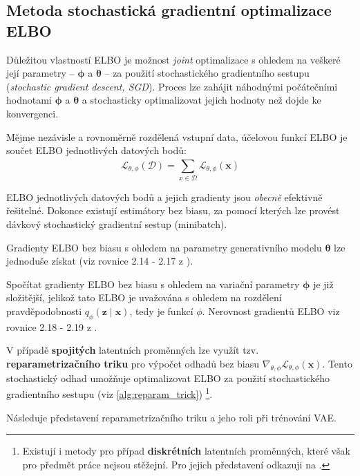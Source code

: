 \subsection{Metoda stochastická gradientní optimalizace ELBO}
Důležitou vlastností ELBO je možnost \emph{joint} optimalizace s ohledem na veškeré její parametry – $\boldsymbol{\phi}$ a $\boldsymbol{\theta}$ – za použití stochastického gradientního sestupu (\emph{stochastic gradient descent, SGD}).
Proces lze zahájit náhodnými počátečními hodnotami $\boldsymbol{\phi}$ a $\boldsymbol{\theta}$ a stochasticky optimalizovat jejich hodnoty než dojde ke konvergenci.

Mějme nezávisle a rovnoměrně rozdělená vstupní data, účelovou funkcí ELBO je součet ELBO jednotlivých datových bodů:
\begin{equation}
    \mathcal{L}_{\theta,\phi}(\mathcal{D}) = \sum_{x\in\mathcal{D}}^{} \mathcal{L}_{\theta,\phi}(\textbf{x})
\end{equation}

ELBO jednotlivých datových bodů a jejich gradienty jsou \emph{obecně} efektivně řešitelné.
Dokonce existují estimátory bez biasu, za pomocí kterých lze provést dávkový stochastický gradientní sestup (minibatch).

Gradienty ELBO bez biasu s ohledem na parametry generativního modelu $\boldsymbol{\theta}$ lze jednoduše získat (viz rovnice 2.14 - 2.17 z \cite{Kingma2019}).

Spočítat gradienty ELBO bez biasu s ohledem na variační parametry $\boldsymbol{\phi}$ je již složitější, jelikož tato ELBO je uvažována s ohledem na rozdělení pravděpodobnosti $q_\phi(\textbf{z}\mid\textbf{x})$, tedy je funkcí $\phi$. Nerovnost gradientů ELBO viz rovnice 2.18 - 2.19 z \cite{Kingma2019}.

V případě \textbf{spojitých} latentních proměnných lze využít tzv. \textbf{reparametrizačního triku} pro výpočet odhadů bez biasu $\nabla_{\theta,\phi}\mathcal{L}_{\theta,\phi}(\textbf{x})$.
Tento stochastický odhad umožňuje optimalizovat ELBO za použití stochastického gradientního sestupu (viz \autoref{alg:reparam_trick})
\footnote{Existují i metody pro případ \textbf{diskrétních} latentních proměnných, které však pro předmět práce nejsou stěžejní. Pro jejich představení odkazuji na \cite[Sekce 2.9.1.]{Kingma2019}.}.

Následuje představení reparametrizačního triku a jeho roli při trénování VAE.